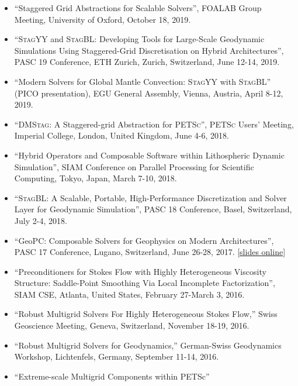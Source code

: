 \begin{itemize}
  \item  ``Staggered Grid Abstractions for Scalable Solvers'', FOALAB Group Meeting, University of Oxford, October 18, 2019.
\item ``\textsc{StagYY} and \textsc{StagBL}: Developing Tools for Large-Scale Geodynamic Simulations Using Staggered-Grid Discretisation on Hybrid Architectures'', PASC 19 Conference, ETH Zurich, Zurich, Switzerland, June 12-14, 2019.
\item ``Modern Solvers for Global Mantle Convection: \textsc{StagYY} with \textsc{StagBL}'' (PICO presentation), EGU General Assembly, Vienna, Austria, April 8-12, 2019.
\item ``\textsc{DMStag}: A Staggered-grid Abstraction for \textsc{PETSc}'', \textsc{PETSc} Users' Meeting, Imperial College, London, United Kingdom, June 4-6, 2018.
\item ``Hybrid Operators and Composable Software within Lithospheric Dynamic Simulation'', SIAM Conference on Parallel Processing for Scientific Computing, Tokyo, Japan, March 7-10, 2018.
\item ``\textsc{StagBL}: A Scalable, Portable, High-Performance Discretization and Solver Layer for Geodynamic Simulation'', PASC 18 Conference, Basel, Switzerland, July 2-4, 2018.
\item ``GeoPC: Composable Solvers for Geophysics on Modern Architectures'', PASC 17 Conference, Lugano, Switzerland, June 26-28, 2017. [\href{http://patricksanan.com/talks/SANAN_patrick_PASC17.pdf}{slides online}]
\item ``Preconditioners for Stokes Flow with Highly Heterogeneous Viscosity Structure: Saddle-Point Smoothing Via Local Incomplete Factorization'', SIAM CSE, Atlanta, United States, February 27-March 3, 2016.
\item ``Robust Multigrid Solvers For Highly Heterogeneous Stokes Flow,'' Swiss Geoscience Meeting, Geneva, Switzerland, November 18-19, 2016.
\item ``Robust Multigrid Solvers for Geodynamics,'' German-Swiss Geodynamics Workshop, Lichtenfels, Germany, September 11-14, 2016.
\item ``Extreme-scale Multigrid Components within PETSc''
\vspace{-8pt}

\end{itemize}
